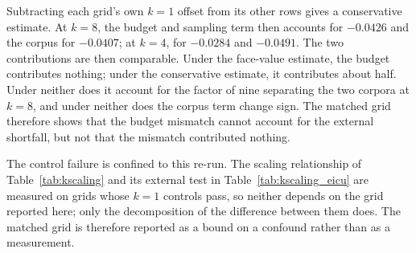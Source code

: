 Subtracting each grid's own $k = 1$ offset from its other rows gives a
conservative estimate. At $k = 8$, the budget and sampling term then accounts
for $-0.0426$ and the corpus for $-0.0407$; at $k = 4$, for $-0.0284$ and
$-0.0491$. The two contributions are then comparable. Under the face-value
estimate, the budget contributes nothing; under the conservative estimate, it
contributes about half. Under neither does it account for the factor of nine
separating the two corpora at $k = 8$, and under neither does the corpus term
change sign. The matched grid therefore shows that the budget mismatch cannot
account for the external shortfall, but not that the mismatch contributed
nothing.

The control failure is confined to this re-run. The scaling relationship of
Table~\ref{tab:kscaling} and its external test in
Table~\ref{tab:kscaling_eicu} are measured on grids whose $k = 1$ controls
pass, so neither depends on the grid reported here; only the decomposition of
the difference between them does. The matched grid is therefore reported as a
bound on a confound rather than as a measurement.
